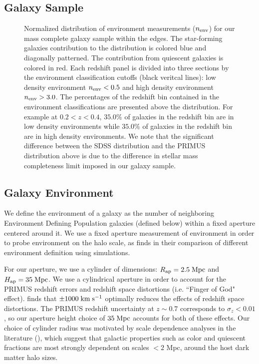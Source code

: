 \documentclass{emulateapj}
\def \apradius{2.5}
\def \apheight{35}
\begin{document}
\subsection{Galaxy Sample} \label{sec:target} 
\begin{figure*}
  \begin{center}
    \leavevmode
     \caption{Normalized distribution of environment measurements ($n_{\rm{env}}$) for our mass complete galaxy sample within the edges. The star-forming galaxies contribution to the distribution is colored blue and diagonally patterned. The contribution from quiescent galaxies is colored in red. Each redshift panel is divided into three sections by the environment classification cutoffs (black veritcal lines): low density environment $n_{\rm{env}} < 0.5$ and high density environment $n_{\rm{env}} > 3.0$. The percentages of the redshift bin contained in the environment classifications are presented above the distribution. For example at $0.2 < z < 0.4$, $\apheight.0 \%$ of galaxies in the redshift bin are in low density environments while $35.0\%$ of galaxies in the redshift bin are in high density environments. We note that the significant difference between the SDSS distribution and the PRIMUS distribution above is due to the difference in stellar mass completeness limit imposed in our galaxy sample.}      \label{fig:envcount}
    \end{center}
\end{figure*}

\subsection{Galaxy Environment} \label{sec:environment}
We define the environment of a galaxy as the number of neighboring Environment Defining Population galaxies (defined below) within a fixed aperture centered around it. We use a fixed aperture measurement of environment in order to probe environment on the halo scale, as \cite{Muldrew:2012aa} finds in their comparison of different environment definition using simulations. 

For our aperture, we use a cylinder of dimensions: $R_{\rm{ap}} =
\apradius\;
\rm{Mpc}$ and $H_{\rm{ap}} = \apheight\; \rm{Mpc}$.  We use a
cylindrical aperture in order to account for the PRIMUS redshift
errors and redshift space distortions (i.e. ``Finger of God"
effect). \cite{Cooper:2005aa} finds that $\pm 1000 \; \rm{km} \;
\rm{s^{-1}}$ optimally reduces the effects of redshift space
distortions. The PRIMUS redshift uncertainty at $z \sim 0.7$
corresponds to $\sigma_z < 0.01$, so our aperture height choice of
$\apheight\;
\rm{Mpc}$ accounts for both of these effects. Our choice of
cylinder radius was motivated by scale dependence analyses in the
literature (\citealt{Blanton:2006aa, Wilman:2010aa, Muldrew:2012aa}),
which suggest that galactic properties such as color and quiescent
fractions are most strongly dependent on scales $< 2$ Mpc, around the
host dark matter halo sizes.
\end{document}
